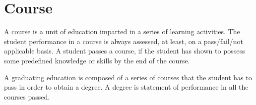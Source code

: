 
\section{Course}

A course is a unit of education imparted in a series of learning activities.
The student performance in a course is always assessed, at least, on a
pass/fail/not applicable basis. A student passes a course, if the student has
shown to possess some predefined knowledge or skills by the end of the course.

A graduating education is composed of a series of courses that the student has
to pass in order to obtain a degree. A degree is statement of performance in
all the courses passed.


